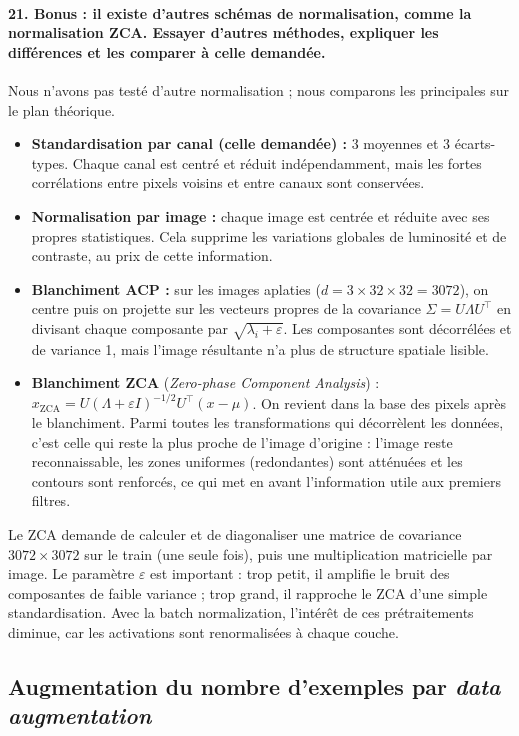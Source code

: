 \documentclass{report}
\begin{document}
\paragraph{21. Bonus : il existe d'autres schémas de normalisation, comme la normalisation ZCA. Essayer d'autres méthodes, expliquer les différences et les comparer à celle demandée.}
 Nous n'avons pas testé d'autre normalisation ; nous comparons les principales sur le plan théorique.
\begin{itemize}
    \item \textbf{Standardisation par canal (celle demandée) :} 3 moyennes et 3 écarts-types. Chaque canal est centré et réduit indépendamment, mais les fortes corrélations entre pixels voisins et entre canaux sont conservées.
    \item \textbf{Normalisation par image :} chaque image est centrée et réduite avec ses propres statistiques. Cela supprime les variations globales de luminosité et de contraste, au prix de cette information.
    \item \textbf{Blanchiment ACP :} sur les images aplaties ($d = 3 \times 32 \times 32 = 3072$), on centre puis on projette sur les vecteurs propres de la covariance $\Sigma = U \Lambda U^\top$ en divisant chaque composante par $\sqrt{\lambda_i + \varepsilon}$. Les composantes sont décorrélées et de variance 1, mais l'image résultante n'a plus de structure spatiale lisible.
    \item \textbf{Blanchiment ZCA} (\textit{Zero-phase Component Analysis}) : $x_{\text{ZCA}} = U (\Lambda + \varepsilon I)^{-1/2} U^\top (x - \mu)$. On revient dans la base des pixels après le blanchiment. Parmi toutes les transformations qui décorrèlent les données, c'est celle qui reste la plus proche de l'image d'origine : l'image reste reconnaissable, les zones uniformes (redondantes) sont atténuées et les contours sont renforcés, ce qui met en avant l'information utile aux premiers filtres.
\end{itemize}
Le ZCA demande de calculer et de diagonaliser une matrice de covariance $3072 \times 3072$ sur le train (une seule fois), puis une multiplication matricielle par image. Le paramètre $\varepsilon$ est important : trop petit, il amplifie le bruit des composantes de faible variance ; trop grand, il rapproche le ZCA d'une simple standardisation. Avec la batch normalization, l'intérêt de ces prétraitements diminue, car les activations sont renormalisées à chaque couche.

\subsection{Augmentation du nombre d'exemples par \textit{data augmentation}}
\end{document}
